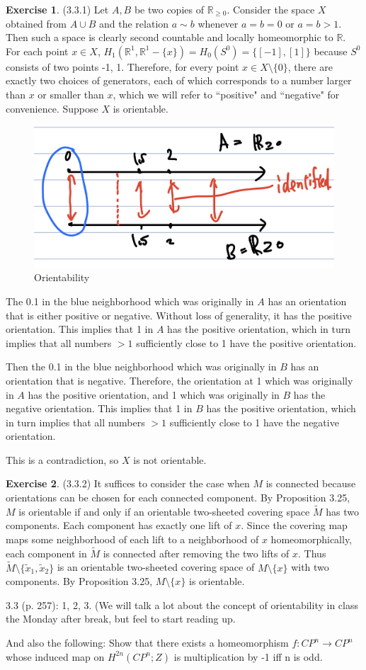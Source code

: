 \documentclass[12pt, psamsfonts]{amsart}
\theoremstyle{definition}
\newtheorem*{exer}{Exercise}
\theoremstyle{remark}
\numberwithin{equation}{section}
\begin{document}
\begin{exer}{(3.3.1)}
  Let $A, B$ be two copies of $\mathbb{R}_{\geq 0}$.
  Consider the space $X$ obtained from $A \cup B$ and the relation $a \sim b$ whenever $a = b = 0$ or $a = b > 1$.
  Then such a space is clearly second countable and locally homeomorphic to $\mathbb{R}$.
  For each point $x \in X$, $H_1(\mathbb{R}^1, \mathbb{R}^1 - \{ x \}) = H_0(S^0) = \{ [-1], [1] \}$ because $S^0$ consists of two points -1, 1.
  Therefore, for every point $x \in X \setminus \{ 0 \}$, there are exactly two choices of generators, each of which corresponds to a number larger than $x$ or smaller than $x$, which we will refer to ``positive" and ``negative" for convenience.
  Suppose $X$ is orientable.
  \begin{figure}[!htb]
  \includegraphics[width=.5\linewidth]{orientability.jpeg}
  \caption{Orientability}
  \label{fig:orientability}
  \end{figure}
  The 0.1 in the blue neighborhood which was originally in $A$ has an orientation that is either positive or negative.
  Without loss of generality, it has the positive orientation.
  This implies that 1 in $A$ has the positive orientation, which in turn implies that all numbers $> 1$ sufficiently close to 1 have the positive orientation.

  Then the 0.1 in the blue neighborhood which was originally in $B$ has an orientation that is negative.
  Therefore, the orientation at 1 which was originally in $A$ has the positive orientation, and 1 which was originally in $B$ has the negative orientation.
  This implies that 1 in $B$ has the positive orientation, which in turn implies that all numbers $> 1$ sufficiently close to 1 have the negative orientation.

  This is a contradiction, so $X$ is not orientable.
\end{exer}

\begin{exer}{(3.3.2)}
  It suffices to consider the case when $M$ is connected because orientations can be chosen for each connected component.
  By Proposition 3.25, $M$ is orientable if and only if an orientable two-sheeted covering space $\tilde{M}$ has two components.
  Each component has exactly one lift of $x$.
  Since the covering map maps some neighborhood of each lift to a neighborhood of $x$ homeomorphically, each component in $\tilde{M}$ is connected after removing the two lifts of $x$.
  Thus $\tilde{M} \setminus \{ \tilde{x}_1, \tilde{x}_2 \}$ is an orientable two-sheeted covering space of $M \setminus \{ x \}$ with two components.
  By Proposition 3.25, $M \setminus \{ x \}$ is orientable.
\end{exer}


3.3 (p. 257): 1, 2, 3. (We will talk a lot about the concept of orientability in class the Monday after break, but feel to start reading up.

And also the following: Show that there exists a homeomorphism $f: CP^n \to CP^n$ whose induced map on $H^{2n}(CP^n;Z)$ is multiplication by -1 iff n is odd.
\end{document}
